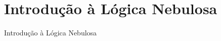 \section{Introdução à Lógica Nebulosa} %

\begin{frame}[t]
\vskip 3cm
\begin{center}
{\Huge Introdução à Lógica Nebulosa}
\end{center}
\end{frame}